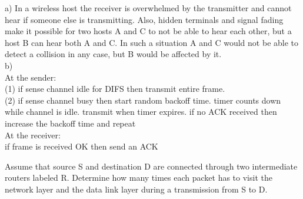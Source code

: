 \documentclass[answers,addpoints]{exam}
\begin{document}
\begin{questions}
\question
{}

\begin{solution}
a) In a wireless host the receiver is overwhelmed by the transmitter and cannot hear if someone else is transmitting. Also, hidden terminals and signal fading make it possible for two hosts A and C to not be able to hear each other, but a host B can hear both A and C. In such a situation A and C would not be able to detect a collision in any case, but B would be affected by it.\\
b) \\
    At the sender:\\
    (1) if sense channel idle for DIFS then transmit entire frame.\\
    (2) if sense channel busy then start random backoff time. timer counts down while channel is idle. transmit when timer expires. if no ACK received then increase the backoff time and repeat \\

    At the receiver:\\
    if frame is received OK then send an ACK
\end{solution}

\question
Assume that source S and destination D are connected through two intermediate routers labeled R. Determine how many times each packet has to visit the network layer and the data link layer during a transmission from S to D.\\
\end{questions}
\end{document}
